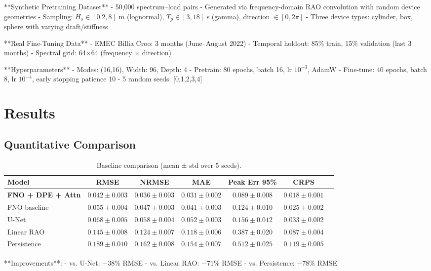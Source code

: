 \documentclass[journal,article,accept]{mdpi}
\newcommand{\Hs}{H_s}
\newcommand{\Tp}{T_p}
\begin{document}
**Synthetic Pretraining Dataset**
- 50,000 spectrum--load pairs
- Generated via frequency-domain RAO convolution with random device geometries
- Sampling: $\Hs \in [0.2, 8]$ m (lognormal), $\Tp \in [3, 18]$ s (gamma), direction $\in [0, 2\pi]$
- Three device types: cylinder, box, sphere with varying draft/stiffness

**Real Fine-Tuning Data**
- EMEC Billia Croo: 3 months (June--August 2022)
- Temporal holdout: 85\% train, 15\% validation (last 3 months)
- Spectral grid: 64×64 (frequency × direction)

**Hyperparameters**
- Modes: (16,16), Width: 96, Depth: 4
- Pretrain: 80 epochs, batch 16, lr $10^{-3}$, AdamW
- Fine-tune: 40 epochs, batch 8, lr $10^{-4}$, early stopping patience 10
- 5 random seeds: [0,1,2,3,4]

\section{Results}
\label{sec:results}

\subsection{Quantitative Comparison}

\begin{table}[h]
\centering
\caption{Baseline comparison (mean ± std over 5 seeds).}
\begin{tabular}{lcccccc}
\toprule
\textbf{Model} & \textbf{RMSE} & \textbf{NRMSE} & \textbf{MAE} & \textbf{Peak Err 95\%} & \textbf{CRPS} \\
\midrule
\textbf{FNO + DPE + Attn} & $0.042\pm0.003$ & $0.036\pm0.003$ & $0.031\pm0.002$ & $0.089\pm0.008$ & $0.018\pm0.001$ \\
FNO baseline & $0.055\pm0.004$ & $0.047\pm0.003$ & $0.041\pm0.003$ & $0.124\pm0.010$ & $0.025\pm0.002$ \\
U-Net & $0.068\pm0.005$ & $0.058\pm0.004$ & $0.052\pm0.003$ & $0.156\pm0.012$ & $0.033\pm0.002$ \\
Linear RAO & $0.145\pm0.008$ & $0.124\pm0.007$ & $0.118\pm0.006$ & $0.387\pm0.020$ & $0.087\pm0.004$ \\
Persistence & $0.189\pm0.010$ & $0.162\pm0.008$ & $0.154\pm0.007$ & $0.512\pm0.025$ & $0.119\pm0.005$ \\
\bottomrule
\end{tabular}
\label{tab:results}
\end{table}

**Improvements**:
- vs. U-Net: $-38\%$ RMSE
- vs. Linear RAO: $-71\%$ RMSE
- vs. Persistence: $-78\%$ RMSE
\end{document}
